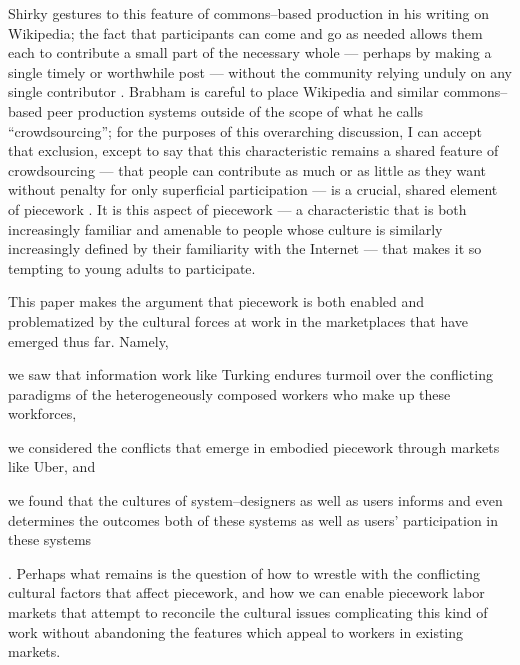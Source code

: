 \documentclass[11pt]{article}
\begin{document}
Shirky gestures to this feature of commons--based production in his writing on Wikipedia;
the fact that participants can come and go as needed allows them each to contribute a small part of the necessary whole
--- perhaps by making a single timely or worthwhile post ---
without the community relying unduly on any single contributor
\cite{shirky2008here}.
Brabham is careful to place Wikipedia and similar commons--based peer production systems outside of the scope of what he calls ``crowdsourcing'';
for the purposes of this overarching discussion, I can accept that exclusion, except to say that this characteristic remains a shared feature of crowdsourcing
--- that people can contribute as much or as little as they want without penalty for only superficial participation ---
is a crucial, shared element of piecework
\cite{brabham2013crowdsourcing}.
It is this aspect of piecework
--- a characteristic that is both increasingly familiar and amenable to people whose culture is similarly increasingly defined by their familiarity with the Internet ---
that makes it so tempting to young adults to participate.


This paper makes the argument that piecework is both enabled and problematized by the cultural forces at work in the marketplaces that have emerged thus far.
Namely,
\begin{inlinelist}
  \item we saw that information work like Turking endures turmoil over the conflicting paradigms of the heterogeneously composed workers who make up these workforces,
  \item we considered the conflicts that emerge in embodied piecework through markets like Uber, and
  \item we found that the cultures of system--designers as well as users informs and even determines the outcomes both of these systems as well as users' participation in these systems
\end{inlinelist}.
Perhaps what remains is the question of how to wrestle with the conflicting cultural factors that affect piecework,
and how we can enable piecework labor markets that attempt to reconcile the cultural issues complicating this kind of work without abandoning the features which appeal to workers in existing markets.
\end{document}
